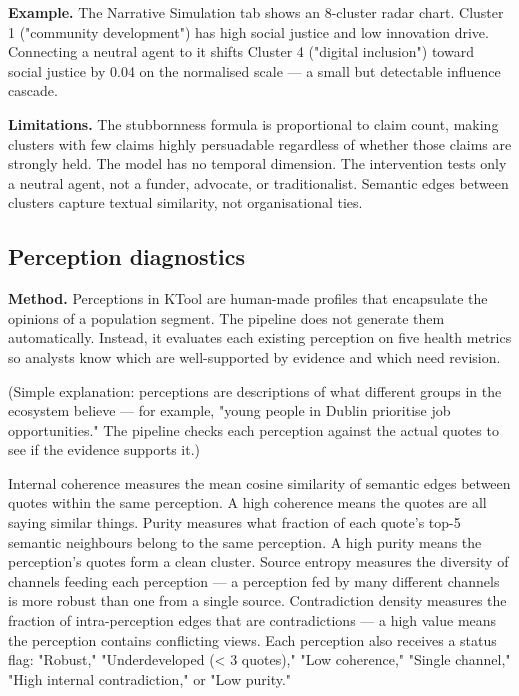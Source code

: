 \documentclass[11pt,a4paper]{article}
\begin{document}
\textbf{Example.} The Narrative Simulation tab shows an 8-cluster radar chart.
Cluster 1 ("community development") has high social justice and low
innovation drive. Connecting a neutral agent to it shifts Cluster 4
("digital inclusion") toward social justice by 0.04 on the normalised
scale — a small but detectable influence cascade.

\textbf{Limitations.} The stubbornness formula is proportional to claim count,
making clusters with few claims highly persuadable regardless of whether
those claims are strongly held. The model has no temporal dimension. The
intervention tests only a neutral agent, not a funder, advocate, or
traditionalist. Semantic edges between clusters capture textual
similarity, not organisational ties.

\subsection{Perception diagnostics}

\textbf{Method.} Perceptions in KTool are human-made profiles that encapsulate
the opinions of a population segment. The pipeline does not generate them
automatically. Instead, it evaluates each existing perception on five
health metrics so analysts know which are well-supported by evidence and
which need revision.

(Simple explanation: perceptions are descriptions of what different
groups in the ecosystem believe — for example, "young people in Dublin
prioritise job opportunities." The pipeline checks each perception
against the actual quotes to see if the evidence supports it.)

Internal coherence measures the mean cosine similarity of semantic edges
between quotes within the same perception. A high coherence means the
quotes are all saying similar things. Purity measures what fraction of
each quote's top-5 semantic neighbours belong to the same perception. A
high purity means the perception's quotes form a clean cluster. Source
entropy measures the diversity of channels feeding each perception —
a perception fed by many different channels is more robust than one
from a single source. Contradiction density measures the fraction of
intra-perception edges that are contradictions — a high value means the
perception contains conflicting views. Each perception also receives a
status flag: "Robust," "Underdeveloped (< 3 quotes)," "Low coherence,"
"Single channel," "High internal contradiction," or "Low purity."
\end{document}
